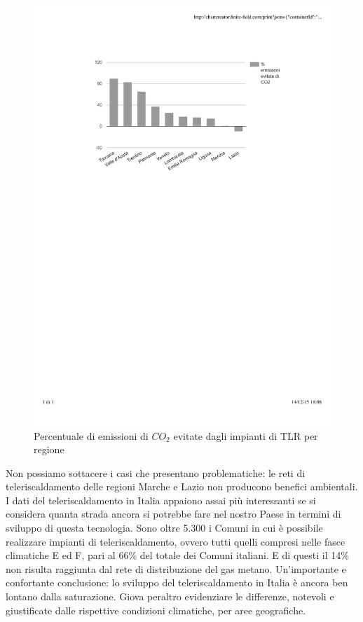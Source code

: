 \documentclass[laurea,oneside,11pt]{USiena_tesiLM}
\begin{document}
\begin{figure}[!ht]
\centering
\includegraphics[width=\textwidth]{figure/CO2} 
\caption{Percentuale di emissioni di $CO_2$ evitate dagli impianti di TLR per regione}
\label{fig:CO2}
\end{figure}

Non possiamo sottacere i casi che presentano problematiche: le reti di teleriscaldamento delle regioni Marche e Lazio non producono benefici ambientali.\\

I dati del teleriscaldamento in Italia appaiono assai più interessanti se si considera quanta strada ancora si potrebbe fare nel nostro Paese in termini di sviluppo di questa tecnologia. Sono oltre 5.300 i Comuni in cui è possibile realizzare impianti di teleriscaldamento, ovvero tutti quelli compresi nelle fasce climatiche E ed F, pari al 66\% del totale dei Comuni italiani. E di questi il 14\% non risulta raggiunta dal rete di distribuzione del gas metano. 
Un'importante e confortante conclusione: lo sviluppo del teleriscaldamento in Italia è ancora ben lontano dalla saturazione.
Giova peraltro evidenziare le differenze, notevoli e giustificate dalle rispettive condizioni climatiche, per aree geografiche.\\
\end{document}
